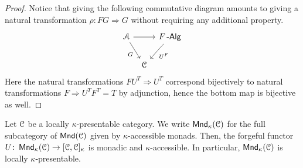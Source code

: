 \documentclass[a4paper,11pt,oneside,openany]{scrbook}
\begin{document}
\begin{proof}
	Notice that giving the following commutative diagram amounts to giving a natural transformation $\rho\colon FG\Rightarrow G$ without requiring any additional property.
	\[
		\begin{tikzcd}[column sep=tiny]
			\A\ar[rr]\ar[dr, swap, "G"]
			&& F\Alg\ar[dl, "U^F"] \\
			& \C
		\end{tikzcd}
	\]
	Here the natural transformations $FU^T\Rightarrow U^T$ correspond bijectively to natural transformations $F\Rightarrow U^TF^T=T$ by adjunction, hence the bottom map is bijective as well.
\end{proof}

\begin{thm}
	Let $\operatorname{\mathcal{C}}$ be a locally $\kappa$-presentable category. We write $\operatorname{\mathsf{Mnd}}_\kappa(\operatorname{\mathcal{C}})$ for the full subcategory of $\operatorname{\mathsf{Mnd}}(\operatorname{\mathcal{C}})$ given by $\kappa$-accessible monads. Then, the forgeful functor $U\colon \operatorname{\mathsf{Mnd}}_\kappa(\operatorname{\mathcal{C}})\rightarrow[\operatorname{\mathcal{C}},\operatorname{\mathcal{C}}]_\kappa$ is monadic and $\kappa$-accessible. In particular, $\operatorname{\mathsf{Mnd}}_\kappa(\operatorname{\mathcal{C}})$ is locally $\kappa$-presentable.
\end{thm}
\end{document}

